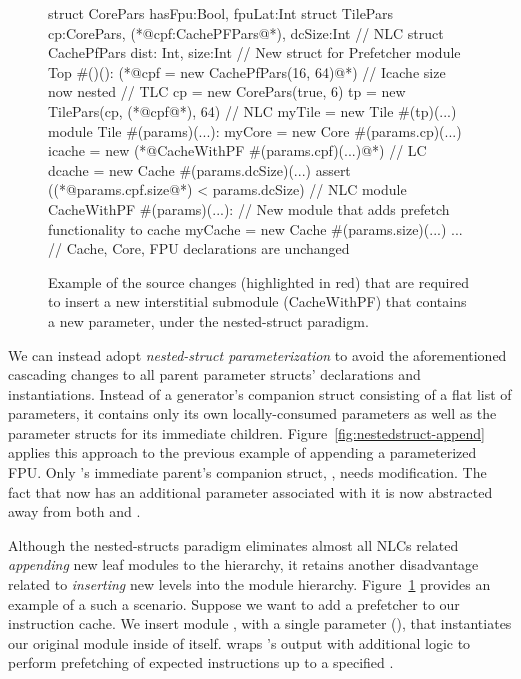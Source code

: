 \begin{figure}
\centering
\begin{phdl}
struct CorePars {hasFpu:Bool, fpuLat:Int}
struct TilePars {cp:CorePars, (*@\textcolor[rgb]{1,0,0}{cpf:CachePFPars}@*), dcSize:Int}      // NLC
struct CachePfPars {dist: Int, size:Int} // New struct for Prefetcher
module Top #()():
  (*@\textcolor[rgb]{1,0,0}{cpf = new CachePfPars(16, 64)}@*)  // Icache size now nested      // TLC
  cp = new CorePars(true, 6)
  tp = new TilePars(cp, (*@\textcolor[rgb]{1,0,0}{cpf}@*), 64)                                // NLC
  myTile = new Tile #(tp)(...)
module Tile #(params)(...):
  myCore = new Core  #(params.cp)(...)
  icache = new (*@\textcolor[rgb]{1,0,0}{CacheWithPF \#(params.cpf)(...)}@*)                   // LC
  dcache = new Cache #(params.dcSize)(...)
  assert ((*@\textcolor[rgb]{1,0,0}{params.cpf.size}@*) < params.dcSize)                      // NLC
module CacheWithPF #(params)(...):  // New module that adds prefetch functionality to cache
  myCache = new Cache #(params.size)(...)
... // Cache, Core, FPU declarations are unchanged
\end{phdl} 
\caption{Example of the source changes (highlighted in red) that are required to insert a new interstitial submodule (CacheWithPF) that contains a new parameter,
under the nested-struct paradigm.}
\label{fig:nestedstruct-insert}
\end{figure}

We can instead adopt \emph{nested-struct parameterization} to avoid the aforementioned cascading changes to all parent parameter structs' declarations and instantiations. 
Instead of a generator's companion struct consisting of a flat list of parameters, it contains only its own locally-consumed parameters as well as the parameter structs for its immediate children. 
Figure~\ref{fig:nestedstruct-append} applies this approach to the previous example of appending a parameterized FPU.
Only 's immediate parent's companion struct, , needs modification.
The fact that  now has an additional parameter associated with it is now abstracted away from both  and .

Although the nested-structs paradigm eliminates almost all NLCs related {\em appending} new leaf modules to the hierarchy,
it retains another disadvantage related to {\em inserting} new levels into the module hierarchy.
Figure~\ref{fig:nestedstruct-insert} provides an example of a such a scenario.
Suppose we want to add a prefetcher to our instruction cache. 
We insert module , with a single parameter (), that instantiates our original  module inside of itself.
 wraps 's output with additional logic to perform prefetching of expected instructions up to a specified .

